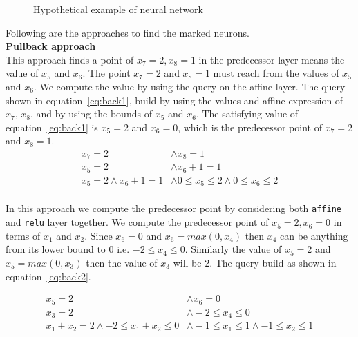 \begin{figure}[!ht]
	\centering
	\scalebox{0.8}{}
	\caption{Hypothetical example of neural network}
	\label{fig:motivating}
\end{figure}


Following are the approaches to find the marked neurons.
\\
\textbf{Pullback approach}\\
This approach finds a point of $x_7=2,x_8=1$ in the predecessor layer means the value of $x_5$ and $x_6$. 
The point $x_7=2$ and $x_8=1$ must reach from the values of $x_5$ and $x_6$. 
We compute the value by using the \sat{} query on the affine layer. The \sat{} query shown 
in equation~\ref{eq:back1}, 
build by using the values and affine expression of $x_7$, $x_8$, and by using the bounds of $x_5$ and $x_6$.
The satisfying value of equation~\ref{eq:back1} is $x_5=2$ and $x_6=0$, which is the predecessor point of $x_7=2$
and $x_8=1$.  
\begin{equation}
    \begin{aligned}
        x_7 = 2 & \land x_8 = 1 \\
        x_5 = 2 & \land x_6 + 1 = 1 \\ 
        x_5=2\land x_6+1 = 1 & \land 0\leq x_5 \leq 2 \land 0\leq x_6 \leq 2 \\
    \end{aligned}
\label{eq:back1}
\end{equation}

In this approach we compute the predecessor point by considering both \texttt{affine} and \texttt{relu} layer together. 
We compute the predecessor point of $x_5=2, x_6=0$ in terms of $x_1$ and $x_2$.
Since $x_6=0$ and $x_6=max(0,x_4)$ then $x_4$ can be anything from its lower bound to $0$ i.e. $-2 \leq x_4 \leq 0$.
Similarly the value of $x_5=2$ and $x_5=max(0,x_3)$ then the value of $x_3$ will be $2$. 
The \sat{} query build as shown in equation~\ref{eq:back2}. 

\begin{equation}
    \begin{aligned}
        x_5 = 2 & \land x_6 = 0 \\
        x_3 = 2 & \land -2\leq x_4 \leq 0 \\ 
        x_1+x_2=2\land -2\leq  x_1+x_2 \leq 0 & \land -1\leq x_1 \leq 1 \land -1\leq x_2 \leq 1 \\
    \end{aligned}
\label{eq:back2}
\end{equation}

